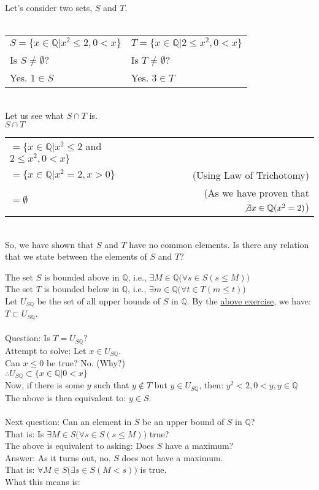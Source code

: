 Let's consider two sets, $S$ and $T$.\\~\\
\begin{tabular}{l|l}
    $S = \{x\in\mathbb{Q}|x^2\le 2, 0 < x\}$ & $T = \{x\in\mathbb{Q}|2\le x^2, 0 < x\}$ \\
    Is $S\neq\emptyset?$ & Is $T\neq\emptyset?$\\
    Yes. $1\in S$  & Yes. $3\in T$
\end{tabular}\\
Let us see what $S\cap T$ is.\\
$S\cap T $
\begin{tabular}[t]{l r}
    $= \{x\in\mathbb{Q}|x^2 \le 2$ and $2\le x^2, 0 < x\}$ & \\
    $= \{x\in\mathbb{Q}|x^2 = 2, x > 0\}$ & (Using Law of Trichotomy)\\
    $= \emptyset$ & (As we have proven that $\not\exists x\in \mathbb{Q} (x^2 = 2)$)
\end{tabular}\\
So, we have shown that $S$ and $T$ have no common elements. Is there any relation that we state between the elements of $S$ and $T$?

\hrulefill
{}

\hrulefill

The set $S$ is bounded above in $\mathbb{Q}$, i.e., $\exists M \in \mathbb{Q}\big(\forall s\in S(s \le M)\big)$\\
The set $T$ is bounded below in $\mathbb{Q}$, i.e., $\exists m \in \mathbb{Q}\big(\forall t\in T(m \le t)\big)$\\
Let $U_{S\mathbb{Q}}$ be the set of all upper bounds of $S$ in $\mathbb{Q}$. By the \hyperref[ex:7.1]{above exercise}, we have: $T \subset U_{S\mathbb{Q}}$.\\~\\
Question: Is $T = U_{S\mathbb{Q}}?$\\
Attempt to solve: Let $x \in U_{S\mathbb{Q}}$.\\
Can $x \le 0$ be true? No. (Why?)\\
$\therefore U_{S\mathbb{Q}} \subset \{x\in\mathbb{Q}|0 < x\}$\\
Now, if there is some $y$ such that $y \not \in T$ but $y \in U_{S\mathbb{Q}}$, then: $y^2 < 2, 0 < y, y \in \mathbb{Q}$\\
The above is then equivalent to: $y\in S$.\\~\\
Next question: Can an element in $S$ be an upper bound of $S$ in $\mathbb{Q}$?\\
That is: Is $\exists M \in S\big(\forall s \in S(s\le M)\big)$ true?\\
The above is equivalent to asking: Does $S$ have a maximum?\\
Answer: As it turns out, no. $S$ does not have a maximum.\\
That is: $\forall M \in S\big(\exists s \in S(M < s)\big)$ is true.\\
What this means is:\\


